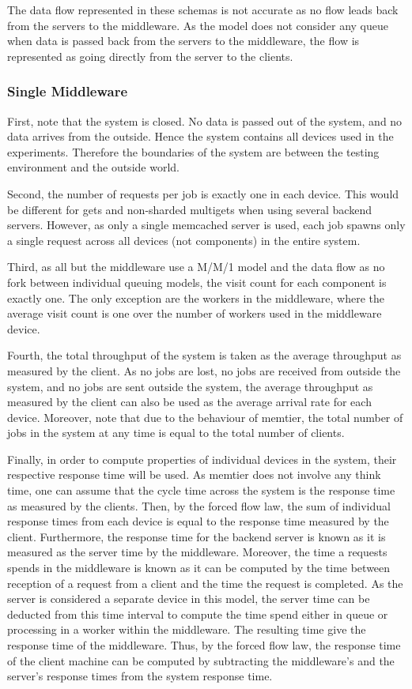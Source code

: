 \documentclass[11pt,a4paper]{article}
\begin{document}
The data flow represented in these schemas is not accurate as no flow leads back from the servers to the middleware. As the model does not consider any queue when data is passed back from the servers to the middleware, the flow is represented as going directly from the server to the clients.

\subsubsection{Single Middleware}
First, note that the system is closed. No data is passed out of the system, and no data arrives from the outside. Hence the system contains all devices used in the experiments. Therefore the boundaries of the system are between the testing environment and the outside world.

Second, the number of requests per job is exactly one in each device. This would be different for gets and non-sharded multigets when using several backend servers. However, as only a single memcached server is used, each job spawns only a single request across all devices (not components) in the entire system.

Third, as all but the middleware use a M/M/1 model and the data flow as no fork between individual queuing models, the visit count for each component is exactly one. The only exception are the workers in the middleware, where the average visit count is one over the number of workers used in the middleware device.

Fourth, the total throughput of the system is taken as the average throughput as measured by the client. As no jobs are lost, no jobs are received from outside the system, and no jobs are sent outside the system, the average throughput as measured by the client can also be used as the average arrival rate for each device. Moreover, note that due to the behaviour of memtier, the total number of jobs in the system at any time is equal to the total number of clients.

Finally, in order to compute properties of individual devices in the system, their respective response time will be used. As memtier does not involve any think time, one can assume that the cycle time across the system is the response time as measured by the clients. Then, by the forced flow law, the sum of individual response times from each device is equal to the response time measured by the client. Furthermore, the response time for the backend server is known as it is measured as the server time by the middleware. Moreover, the time a requests spends in the middleware is known as it can be computed by the time between reception of a request from a client and the time the request is completed. As the server is considered a separate device in this model, the server time can be deducted from this time interval to compute the time spend either in queue or processing in a worker within the middleware. The resulting time give the response time of the middleware. Thus, by the forced flow law, the response time of the client machine can be computed by subtracting the middleware's and the server's response times from the system response time.
\end{document}
